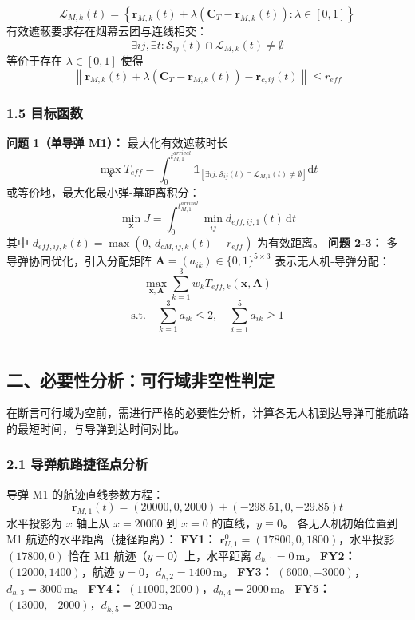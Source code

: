 \documentclass{JXUSTmodeling}
\begin{document}
\begin{equation}
\mathcal{L}_{M,k}(t)=\left\{\mathbf{r}_{M,k}(t)+\lambda(\mathbf{C}_T-\mathbf{r}_{M,k}(t)):\lambda\in[0,1]\right\} \tag{1.18}
\end{equation}
有效遮蔽要求存在烟幕云团与连线相交：
\begin{equation}
\exists ij,\exists t:\mathcal{S}_{ij}(t)\cap\mathcal{L}_{M,k}(t)\neq\emptyset \tag{1.19}
\end{equation}
等价于存在 $\lambda\in[0,1]$ 使得
\begin{equation}
\left\|\mathbf{r}_{M,k}(t)+\lambda(\mathbf{C}_T-\mathbf{r}_{M,k}(t))-\mathbf{r}_{c,ij}(t)\right\|\leq r_{eff} \tag{1.20}
\end{equation}
\subsubsection{1.5 目标函数}
\textbf{问题 1（单导弹 M1）：} 最大化有效遮蔽时长
\begin{equation}
\max_{\mathbf{x}} T_{eff}=\int_{0}^{t_{M,1}^{arrival}}\mathbb{1}_{\left[\exists ij:\mathcal{S}_{ij}(t)\cap\mathcal{L}_{M,1}(t)\neq\emptyset\right]}\mathrm{d}t \tag{1.21}
\end{equation}
或等价地，最大化最小弹-幕距离积分：
\begin{equation}
\min_{\mathbf{x}} J=\int_{0}^{t_{M,1}^{arrival}}\min_{ij}d_{eff,ij,1}(t)\,\mathrm{d}t \tag{1.22}
\end{equation}
其中 $d_{eff,ij,k}(t)=\max\left(0,\,d_{cM,ij,k}(t)-r_{eff}\right)$ 为有效距离。
\textbf{问题 2-3：} 多导弹协同优化，引入分配矩阵 $\mathbf{A}=(a_{ik})\in\{0,1\}^{5\times 3}$ 表示无人机-导弹分配：
\begin{equation}
\max_{\mathbf{x},\mathbf{A}}\sum_{k=1}^{3}w_k T_{eff,k}(\mathbf{x},\mathbf{A}) \tag{1.23}
\end{equation}
\begin{equation}
\text{s.t.}\quad \sum_{k=1}^{3}a_{ik}\leq 2,\quad \sum_{i=1}^{5}a_{ik}\geq 1 \tag{1.24}
\end{equation}
\noindent\rule{\textwidth}{0.4pt}
\subsection{二、必要性分析：可行域非空性判定}
在断言可行域为空前，需进行严格的必要性分析，计算各无人机到达导弹可能航路的最短时间，与导弹到达时间对比。
\subsubsection{2.1 导弹航路捷径点分析}
导弹 M1 的航迹直线参数方程：
\begin{equation}
\mathbf{r}_{M,1}(t)=(20000,0,2000)+(-298.51,0,-29.85)t \tag{2.1}
\end{equation}
水平投影为 $x$ 轴上从 $x=20000$ 到 $x=0$ 的直线，$y\equiv 0$。
各无人机初始位置到 M1 航迹的水平距离（捷径距离）：
\textbf{FY1：} $\mathbf{r}_{U,1}^0=(17800,0,1800)$，水平投影 $(17800,0)$ 恰在 M1 航迹（$y=0$）上，水平距离 $d_{h,1}=0\,\mathrm{m}$。
\textbf{FY2：} $(12000,1400)$，航迹 $y=0$，$d_{h,2}=1400\,\mathrm{m}$。
\textbf{FY3：} $(6000,-3000)$，$d_{h,3}=3000\,\mathrm{m}$。
\textbf{FY4：} $(11000,2000)$，$d_{h,4}=2000\,\mathrm{m}$。
\textbf{FY5：} $(13000,-2000)$，$d_{h,5}=2000\,\mathrm{m}$。
\end{document}
